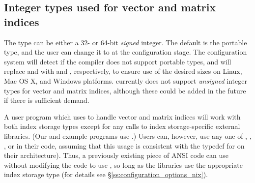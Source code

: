 \subsection{Integer types used for vector and matrix indices}

The type  can be either a 32- or 64-bit \emph{signed} integer.
The default is the portable  type, and the user can change it
to  at the configuration stage. The configuration system
will detect if the compiler does not support portable types, and will
replace  and  with  and ,
respectively, to ensure use of the desired sizes on Linux, Mac OS X, and Windows
platforms. {\sundials} currently does not support \emph{unsigned} integer types 
for vector and matrix indices, although these could be added in the future if there 
is sufficient demand.

A user program which uses  to handle vector and matrix indices
will work with both index storage types except for any calls to index storage-specific
external libraries. (Our  and  example programs use .)
Users can, however, use any one of , , ,  or
 in their code, assuming that this usage is consistent with the typedef
for  on their architecture). Thus, a previously existing piece of ANSI
{\CC} code can use {\sundials} without modifying the code to use ,
so long as the {\sundials} libraries use the appropriate index storage type (for details
see \S\ref{ss:configuration_options_nix}).
